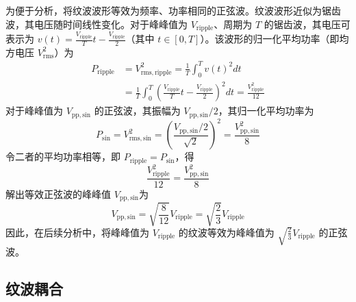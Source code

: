 \documentclass{ctexart}
\begin{document}
为便于分析，将纹波波形等效为频率、功率相同的正弦波。纹波波形近似为锯齿波，其电压随时间线性变化。对于峰峰值为 $V_{\mathrm{ripple}}$、周期为 $T$ 的锯齿波，其电压可表示为 $v(t) = \frac{V_{\mathrm{ripple}}}{T}t - \frac{V_{\mathrm{ripple}}}{2}$（其中 $t \in [0, T]$）。该波形的归一化平均功率（即均方电压 $V_{\mathrm{rms}}^2$）为
\begin{align*}
P_{\mathrm{ripple}} &= V_{\mathrm{rms,ripple}}^2 = \frac{1}{T}\int_0^T v(t)^2 dt \\
&= \frac{1}{T}\int_0^T \left(\frac{V_{\mathrm{ripple}}}{T}t - \frac{V_{\mathrm{ripple}}}{2}\right)^2 dt = \frac{V_{\mathrm{ripple}}^2}{12}
\end{align*}
对于峰峰值为 $V_{\mathrm{pp,sin}}$ 的正弦波，其振幅为 $V_{\mathrm{pp,sin}}/2$，其归一化平均功率为
\begin{equation*}
P_{\mathrm{sin}} = V_{\mathrm{rms,sin}}^2 = \left(\frac{V_{\mathrm{pp,sin}}/2}{\sqrt{2}}\right)^2 = \frac{V_{\mathrm{pp,sin}}^2}{8}
\end{equation*}
令二者的平均功率相等，即 $P_{\mathrm{ripple}} = P_{\mathrm{sin}}$，得
\begin{equation*}
\frac{V_{\mathrm{ripple}}^2}{12} = \frac{V_{\mathrm{pp,sin}}^2}{8}
\end{equation*}
解出等效正弦波的峰峰值 $V_{\mathrm{pp,sin}}$为
\begin{equation*}
V_{\mathrm{pp,sin}} = \sqrt{\frac{8}{12}}V_{\mathrm{ripple}} = \sqrt{\frac{2}{3}}V_{\mathrm{ripple}}
\end{equation*}
因此，在后续分析中，将峰峰值为 $V_{\mathrm{ripple}}$ 的纹波等效为峰峰值为 $\sqrt{\frac{2}{3}}V_{\mathrm{ripple}}$ 的正弦波。

\subsection{纹波耦合}
\end{document}
